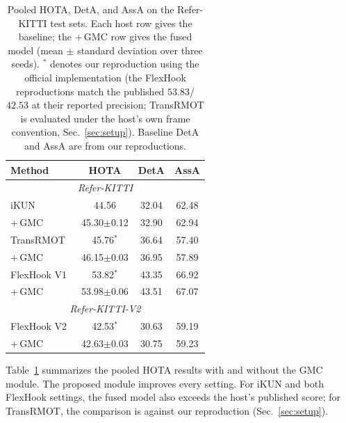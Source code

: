 \documentclass{article}
\begin{document}
\begin{table}[t]
  \centering
  \caption{Pooled HOTA, DetA, and AssA on the Refer-KITTI test sets. Each host row gives the baseline; the +\,GMC row gives the fused model (mean $\pm$ standard deviation over three seeds). $^*$ denotes our reproduction using the official implementation (the FlexHook reproductions match the published $53.83$/$42.53$ at their reported precision; TransRMOT is evaluated under the host's own frame convention, Sec.~\ref{sec:setup}). Baseline DetA and AssA are from our reproductions.}
  \label{tab:main}
  \footnotesize
  \begin{tabular*}{\linewidth}{@{\extracolsep{\fill}}lccc}
    \hline
    Method                      & HOTA               & DetA  & AssA  \\
    \hline
    \multicolumn{4}{c}{\textit{Refer-KITTI}} \\
    \hline
    iKUN~\cite{ikun}            & 44.56              & 32.04 & 62.48 \\
    \quad +\,GMC                & 45.30$\pm$0.12 & 32.90 & 62.94 \\
    \hline
    TransRMOT~\cite{transrmot}  & 45.76$^*$         & 36.64 & 57.40 \\
    \quad +\,GMC                & 46.15$\pm$0.03 & 36.95 & 57.89 \\
    \hline
    FlexHook V1~\cite{flexhook} & 53.82$^*$             & 43.35 & 66.92 \\
    \quad +\,GMC                & 53.98$\pm$0.06 & 43.51 & 67.07 \\
    \hline
    \multicolumn{4}{c}{\textit{Refer-KITTI-V2}} \\
    \hline
    FlexHook V2~\cite{flexhook} & 42.53$^*$             & 30.63 & 59.19 \\
    \quad +\,GMC                & 42.63$\pm$0.03 & 30.75 & 59.23 \\
    \hline
  \end{tabular*}
\end{table}

Table~\ref{tab:main} summarizes the pooled HOTA results with and without the GMC module. The proposed module improves every setting. For iKUN and both FlexHook settings, the fused model also exceeds the host's published score; for TransRMOT, the comparison is against our reproduction (Sec.~\ref{sec:setup}).
\end{document}
